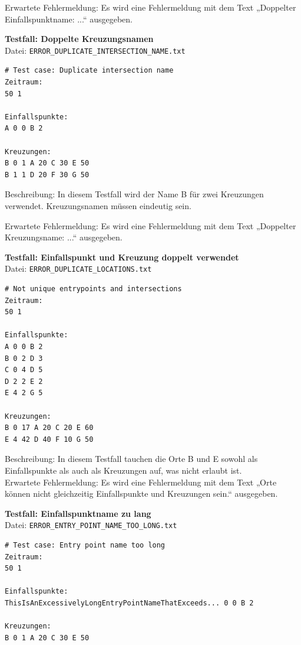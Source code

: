 Erwartete Fehlermeldung: Es wird eine Fehlermeldung mit dem Text „Doppelter Einfallspunktname: ...“ ausgegeben.


\textbf{Testfall: Doppelte Kreuzungsnamen} \\
Datei: \texttt{ERROR\_DUPLICATE\_INTERSECTION\_NAME.txt}

\begin{lstlisting}
# Test case: Duplicate intersection name
Zeitraum:
50 1

Einfallspunkte:
A 0 0 B 2

Kreuzungen:
B 0 1 A 20 C 30 E 50
B 1 1 D 20 F 30 G 50
\end{lstlisting}

Beschreibung: In diesem Testfall wird der Name B für zwei Kreuzungen verwendet.
Kreuzungsnamen müssen eindeutig sein.

Erwartete Fehlermeldung: Es wird eine Fehlermeldung mit dem Text „Doppelter Kreuzungsname: ...“ ausgegeben.

\clearpage
\textbf{Testfall: Einfallspunkt und Kreuzung doppelt verwendet} \\
Datei: \texttt{ERROR\_DUPLICATE\_LOCATIONS.txt}

\begin{lstlisting}
# Not unique entrypoints and intersections
Zeitraum:
50 1

Einfallspunkte:
A 0 0 B 2
B 0 2 D 3
C 0 4 D 5
D 2 2 E 2
E 4 2 G 5

Kreuzungen:
B 0 17 A 20 C 20 E 60
E 4 42 D 40 F 10 G 50
\end{lstlisting}

Beschreibung: In diesem Testfall tauchen die Orte B und E sowohl als Einfallspunkte als auch als Kreuzungen auf, was nicht erlaubt ist. \\
Erwartete Fehlermeldung: Es wird eine Fehlermeldung mit dem Text „Orte können nicht gleichzeitig Einfallspunkte und Kreuzungen sein.“ ausgegeben.

\textbf{Testfall: Einfallspunktname zu lang} \\
Datei: \texttt{ERROR\_ENTRY\_POINT\_NAME\_TOO\_LONG.txt}

\begin{lstlisting}
# Test case: Entry point name too long
Zeitraum:
50 1

Einfallspunkte:
ThisIsAnExcessivelyLongEntryPointNameThatExceeds... 0 0 B 2

Kreuzungen:
B 0 1 A 20 C 30 E 50
\end{lstlisting}

